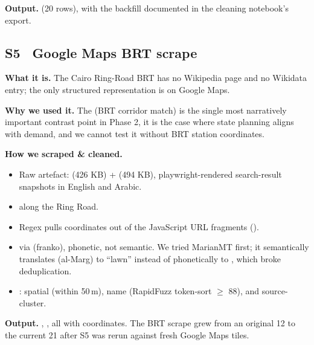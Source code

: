 \textbf{Output.}  (20 rows), with the backfill
documented in the cleaning notebook's
 export.


\subsection{S5 \textbullet\ Google Maps BRT scrape}

\textbf{What it is.} The Cairo Ring-Road BRT has no Wikipedia page and
no Wikidata entry; the only structured representation is on Google Maps.

\textbf{Why we used it.} The  (BRT corridor match) is
the single most narratively important contrast point in Phase 2,
it is the case where state planning aligns with demand, and we cannot
test it without BRT station coordinates.

\textbf{How we scraped \& cleaned.}
\begin{itemize}
 \item Raw artefact:  (426 KB)
 +  (494 KB), playwright-rendered
 search-result snapshots in English and Arabic.
 \item {} along the Ring Road.
 \item Regex pulls coordinates out of the JavaScript URL fragments
 ().
 \item {} via  (franko), phonetic,
 not semantic. We tried MarianMT first; it semantically translates
  (al-Marg) to ``lawn'' instead of phonetically to
 , which broke deduplication.
 \item {}: spatial (within 50\,m), name
 (RapidFuzz token-sort $\geq$ 88), and source-cluster.
\end{itemize}

\textbf{Output.} , , all with
coordinates. The BRT scrape grew from an original 12 to the current 21
after S5 was rerun against fresh Google Maps tiles.


